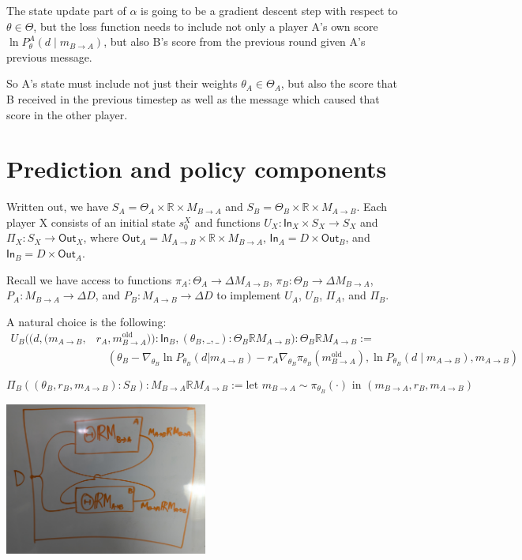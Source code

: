 \documentclass{article}
\begin{document}
The state update part of $\alpha$ is going to be a gradient descent step with respect to $\theta \in \Theta$, but the loss function needs to include not only a player A's own score $\ln P_\theta^A(d \mid m_{B \rightarrow A})$, but also B's score from the previous round given A's previous message.

So A's state must include not just their weights $\theta_A \in \Theta_A$, but also the score that B received in the previous timestep as well as the message which caused that score in the other player.
\section{Prediction and policy components}

Written out, we have $S_A = \Theta_A \times \mathbb{R} \times M_{B\rightarrow A}$ and $S_B = \Theta_B \times \mathbb{R} \times M_{A \rightarrow B}$.
Each player X consists of an initial state $s_0^X$ and functions $U_X : \mathsf{In}_X \times S_X \rightarrow S_X$ and $\Pi_X : S_X \rightarrow \mathsf{Out}_X$, where $\mathsf{Out}_A = M_{A \rightarrow B} \times \mathbb{R} \times M_{B \rightarrow A}$, $\mathsf{In}_A = D \times \mathsf{Out}_B$, and $\mathsf{In}_B = D \times \mathsf{Out}_A$.

Recall we have access to functions $\pi_A : \Theta_A \rightarrow \Delta M_{A \rightarrow B}$, $\pi_B : \Theta_B \rightarrow \Delta M_{B \rightarrow A}$, $P_A : M_{B \rightarrow A} \rightarrow \Delta D$, and $P_B : M_{A \rightarrow B} \rightarrow \Delta D$ to implement $U_A$, $U_B$, $\Pi_A$, and $\Pi_B$.

A natural choice is the following:
\begin{align*}
U_B((d, (m_{A\rightarrow B}, &r_A, m_{B \rightarrow A}^{\text{old}})) : \mathsf{In}_B, (\theta_B, \_, \_) : \Theta_B \mathbb{R} M_{A \rightarrow B}) : \Theta_B \mathbb{R} M_{A \rightarrow B} := \\
&\quad (\theta_B - \nabla_{\theta_B} \ln P_{\theta_B} (d | m_{A \rightarrow B}) - r_A \nabla_{\theta_B} \pi_{\theta_B} (m_{B \rightarrow A}^{\text{old}}), \ln P_{\theta_B} (d \mid m_{A \rightarrow B}), m_{A \rightarrow B})
\end{align*}

$$\Pi_B((\theta_B, r_B, m_{A \rightarrow B}) : S_B) : M_{B \rightarrow A} \mathbb{R} M_{A \rightarrow B} := \text{let } m_{B \rightarrow A} \sim \pi_{\theta_B}(\cdot) \text{ in } (m_{B \rightarrow A}, r_B, m_{A \rightarrow B})$$

\begin{center}
\includegraphics[width=0.5\textwidth]{detailed.jpg}
\end{center}
\end{document}
